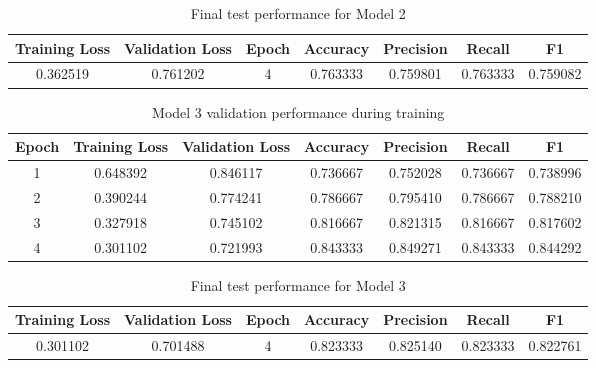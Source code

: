 \documentclass[11pt]{article}
\begin{document}
\clearpage

\begin{table}[h]
\centering
\begin{tabular}{ccccccc}
\toprule
Training Loss & Validation Loss & Epoch & Accuracy & Precision & Recall & F1 \\
\midrule
0.362519 & 0.761202 & 4 & 0.763333 & 0.759801 & 0.763333 & 0.759082 \\
\bottomrule
\end{tabular}
\caption{Final test performance for Model 2}
\end{table}



\begin{table}[h]
\centering
\begin{tabular}{ccccccc}
\toprule
Epoch & Training Loss & Validation Loss & Accuracy & Precision & Recall & F1 \\
\midrule
1 & 0.648392 & 0.846117 & 0.736667 & 0.752028 & 0.736667 & 0.738996 \\
2 & 0.390244 & 0.774241 & 0.786667 & 0.795410 & 0.786667 & 0.788210 \\
3 & 0.327918 & 0.745102 & 0.816667 & 0.821315 & 0.816667 & 0.817602 \\
4 & 0.301102 & 0.721993 & 0.843333 & 0.849271 & 0.843333 & 0.844292 \\
\bottomrule
\end{tabular}
\caption{Model 3 validation performance during training}
\end{table}



\begin{table}[h]
\centering
\begin{tabular}{ccccccc}
\toprule
Training Loss & Validation Loss & Epoch & Accuracy & Precision & Recall & F1 \\
\midrule
0.301102 & 0.701488 & 4 & 0.823333 & 0.825140 & 0.823333 & 0.822761 \\
\bottomrule
\end{tabular}
\caption{Final test performance for Model 3}
\end{table}
\end{document}
